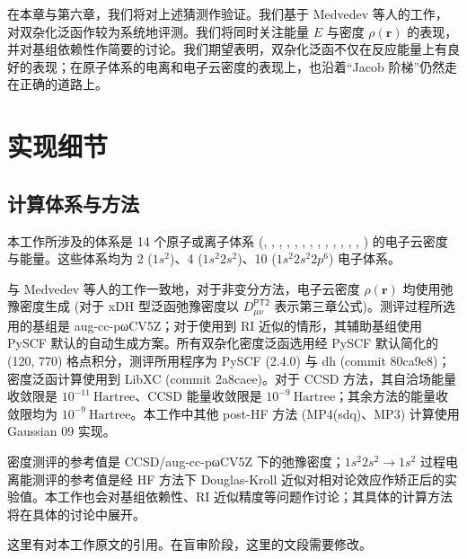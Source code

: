 在本章与第六章，我们将对上述猜测作验证。我们基于 Medvedev 等人的工作\cite{Medvedev-Lyssenko.S.2017}，对双杂化泛函作较为系统地评测。我们将同时关注能量 $E$ 与密度 $\rho(\bm{r})$ 的表现，并对基组依赖性作简要的讨论。我们期望表明，双杂化泛函不仅在反应能量上有良好的表现\cite{Su-Xu.WCMS.2016, Goerigk-Grimme.PCCP.2017, Zhang-Xu.JPCL.2021, Santra-Martin.JPCL.2021}；在原子体系的电离和电子云密度的表现上，也沿着“Jacob 阶梯”仍然走在正确的道路上。

\section{实现细节}

\subsection{计算体系与方法}

本工作所涉及的体系是 14 个原子或离子体系 (, , , , , , , , , , , , , ) 的电子云密度与能量。这些体系均为 2 ($1s^2$)、4 ($1s^2 2s^2$)、10 ($1s^2 2s^2 2p^6$) 电子体系。

与 Medvedev 等人的工作\cite{Medvedev-Lyssenko.S.2017}一致地，对于非变分方法，电子云密度 $\rho (\bm{r})$ 均使用弛豫密度生成 (对于 xDH 型泛函弛豫密度以 $D_{\mu \nu}^\textsf{PT2}$ 表示\alert{第三章公式})。测评过程所选用的基组是 aug-cc-pωCV5Z；对于使用到 RI 近似的情形，其辅助基组使用 PySCF 默认的自动生成方案\cite{Stoychev-Neese.JCTC.2017}。所有双杂化密度泛函选用经 PySCF 默认简化的 (120, 770) 格点积分，测评所用程序为 PySCF (2.4.0)\cite{Sun-Chan.WCMS.2018, Sun-Chan.JCP.2020} 与 dh (commit 80ca9e8)；密度泛函计算使用到 LibXC (commit 2a8caee)\cite{Lehtola-Marques.S.2018}。对于 CCSD 方法，其自洽场能量收敛限是 $10^{-11} \ \text{Hartree}$、CCSD 能量收敛限是 $10^{-9} \ \text{Hartree}$；其余方法的能量收敛限均为 $10^{-9} \ \text{Hartree}$。本工作中其他 post-HF 方法 (MP4(sdq)、MP3) 计算使用 Gaussian 09 实现\cite{Gaussian09, Su-Xu.PNAS.2018}。

密度测评的参考值是 CCSD/aug-cc-pωCV5Z 下的弛豫密度；$1s^2 2s^2 \rightarrow 1s^2$ 过程电离能测评的参考值是经 HF 方法下 Douglas-Kroll 近似对相对论效应作矫正后的实验值\cite{Kepp-Kepp.S.2017, Douglas-Kroll.APY.1974, NIST.Atomic}。本工作也会对基组依赖性、RI 近似精度等问题作讨论；其具体的计算方法将在具体的讨论中展开。

\alert{这里有对本工作原文的引用。在盲审阶段，这里的文段需要修改。}

